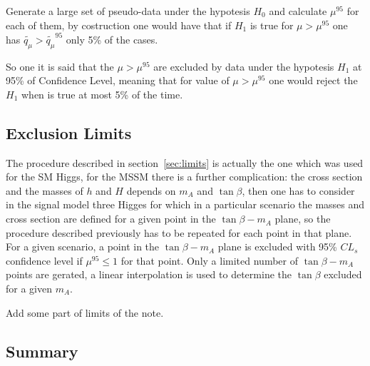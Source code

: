  Generate a large set of pseudo-data under the hypotesis $H_{0}$ and calculate  $\mu^{95}$ for each of them, by costruction one would have
	that if $H_1$ is true for $\mu > \mu^{95}$ one has $\tilde{q_{\mu}} > \tilde{q_{\mu}}^{95}$ only 5\% of the cases.
	
So one it is said that the $\mu > \mu^{95}$ are excluded by data under the hypotesis $H_1$ at 95\% of Confidence Level, meaning that 
for value of $\mu > \mu^{95}$  one would reject the $H_1$ when is true at most 5\% of the time. 

\subsection{Exclusion Limits}
The procedure described in section~\ref{sec:limits} is actually the one which was used for the SM Higgs, for the MSSM there is a further 
complication: the cross section and the masses of $h$ and $H$ depends on $m_A$ and $\tan \beta$, then one has to consider in the signal 
model three Higges for which in a particular scenario the masses and cross section are defined for a given point in the $\tan \beta - m_A$
plane, so the procedure described previously has to be repeated for each point in that plane. For a given scenario, 
a point in the  $\tan \beta - m_A$ plane is excluded with 95\% $CL_{s}$ confidence level if $\mu^{95} \leq 1$ for that point. 
Only a limited number of $\tan \beta - m_A$ points are gerated, a linear interpolation is used to determine the $\tan \beta$ excluded for a given
$m_A$.

Add some part of limits of the note.

 

\subsection{Summary}

